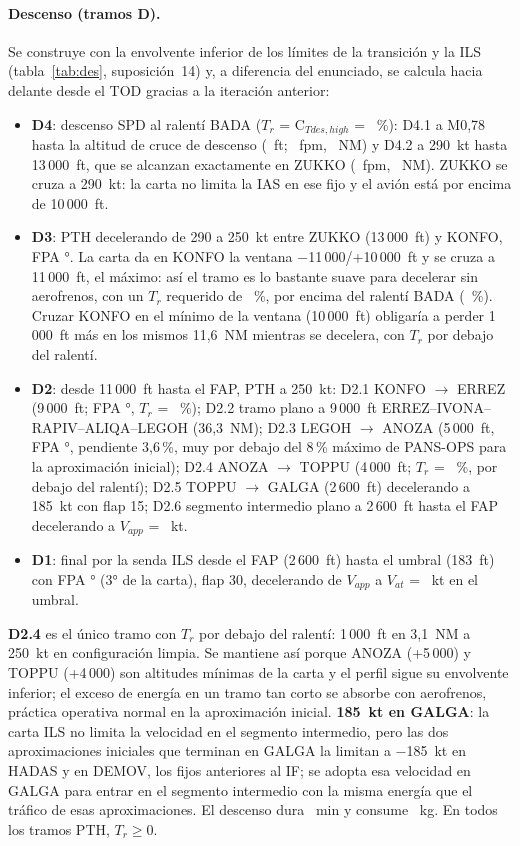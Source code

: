 \documentclass[11pt,a4paper]{article}
\begin{document}
\paragraph{Descenso (tramos D).} Se construye con la envolvente inferior de los límites de la transición y la ILS (tabla~\ref{tab:des}, suposición~14) y, a diferencia del enunciado, se calcula hacia delante desde el TOD gracias a la iteración anterior:
\begin{itemize}
\item \textbf{D4}: descenso SPD al ralentí BADA ($T_r$ = C$_{Tdes,high}$ = \vTrIdle~\%): D4.1 a M0,78 hasta la altitud de cruce de descenso (\vHcrossDes~ft; \vVSDIVI~fpm, \vDIVIlen~NM) y D4.2 a 290~kt hasta 13\,000~ft, que se alcanzan exactamente en ZUKKO (\vVSDIVII~fpm, \vDIVIIlen~NM). ZUKKO se cruza a 290~kt: la carta no limita la IAS en ese fijo y el avión está por encima de 10\,000~ft.
\item \textbf{D3}: PTH decelerando de 290 a 250~kt entre ZUKKO (13\,000~ft) y KONFO, FPA \vFPADIII°. La carta da en KONFO la ventana $-$11\,000/+10\,000~ft y se cruza a 11\,000~ft, el máximo: así el tramo es lo bastante suave para decelerar sin aerofrenos, con un $T_r$ requerido de \vTrDIII~\%, por encima del ralentí BADA (\vTrIdle~\%). Cruzar KONFO en el mínimo de la ventana (10\,000~ft) obligaría a perder 1\,000~ft más en los mismos 11,6~NM mientras se decelera, con $T_r$ por debajo del ralentí.
\item \textbf{D2}: desde 11\,000~ft hasta el FAP, PTH a 250~kt: D2.1 KONFO $\rightarrow$ ERREZ (9\,000~ft; FPA \vFPADIIi°, $T_r$ = \vTrDIIi~\%); D2.2 tramo plano a 9\,000~ft ERREZ--IVONA--RAPIV--ALIQA--LEGOH (36,3~NM); D2.3 LEGOH $\rightarrow$ ANOZA (5\,000~ft, FPA \vFPADIIIII°, pendiente 3,6\,\%, muy por debajo del 8\,\% máximo de PANS-OPS para la aproximación inicial); D2.4 ANOZA $\rightarrow$ TOPPU (4\,000~ft; $T_r$ = \vTrDIIIV~\%, por debajo del ralentí); D2.5 TOPPU $\rightarrow$ GALGA (2\,600~ft) decelerando a 185~kt con flap 15; D2.6 segmento intermedio plano a 2\,600~ft hasta el FAP decelerando a $V_{app}$ = \vVfap~kt.
\item \textbf{D1}: final por la senda ILS desde el FAP (2\,600~ft) hasta el umbral (183~ft) con FPA \vFPADI° (3° de la carta), flap 30, decelerando de $V_{app}$ a $V_{at}$ = \vVref~kt en el umbral.
\end{itemize}
\textbf{D2.4} es el único tramo con $T_r$ por debajo del ralentí: 1\,000~ft en 3,1~NM a 250~kt en configuración limpia. Se mantiene así porque ANOZA (+5\,000) y TOPPU (+4\,000) son altitudes mínimas de la carta y el perfil sigue su envolvente inferior; el exceso de energía en un tramo tan corto se absorbe con aerofrenos, práctica operativa normal en la aproximación inicial. \textbf{185~kt en GALGA}: la carta ILS no limita la velocidad en el segmento intermedio, pero las dos aproximaciones iniciales que terminan en GALGA la limitan a $-$185~kt en HADAS y en DEMOV, los fijos anteriores al IF; se adopta esa velocidad en GALGA para entrar en el segmento intermedio con la misma energía que el tráfico de esas aproximaciones.
El descenso dura \vTdes~min y consume \vFuelDes~kg. En todos los tramos PTH, $T_r \ge 0$.
\end{document}
